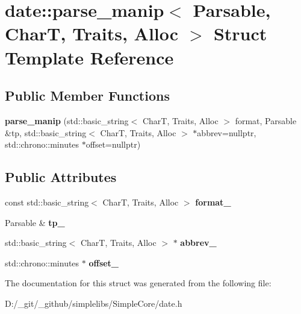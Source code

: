 \hypertarget{structdate_1_1parse__manip}{}\section{date\+::parse\+\_\+manip$<$ Parsable, CharT, Traits, Alloc $>$ Struct Template Reference}
\label{structdate_1_1parse__manip}
\subsection*{Public Member Functions}
\begin{DoxyCompactItemize}
\item 
\mbox{\label{structdate_1_1parse__manip_ae3b911fa07af62da7085e84fda0d2fdf}} 
{\bfseries parse\+\_\+manip} (std\+::basic\+\_\+string$<$ CharT, Traits, Alloc $>$ format, Parsable \&tp, std\+::basic\+\_\+string$<$ CharT, Traits, Alloc $>$ $\ast$abbrev=nullptr, std\+::chrono\+::minutes $\ast$offset=nullptr)
\end{DoxyCompactItemize}
\subsection*{Public Attributes}
\begin{DoxyCompactItemize}
\item 
\mbox{\label{structdate_1_1parse__manip_af27023b2d4f03f72000eab221ccc9479}} 
const std\+::basic\+\_\+string$<$ CharT, Traits, Alloc $>$ {\bfseries format\+\_\+}
\item 
\mbox{\label{structdate_1_1parse__manip_a156c770f48afd2baf9efc0ead9ad3f21}} 
Parsable \& {\bfseries tp\+\_\+}
\item 
\mbox{\label{structdate_1_1parse__manip_a2c8fe6bfdec4c1fb9e7c429f0279e84c}} 
std\+::basic\+\_\+string$<$ CharT, Traits, Alloc $>$ $\ast$ {\bfseries abbrev\+\_\+}
\item 
\mbox{\label{structdate_1_1parse__manip_a7b585e6309dd7baeacb7f67c90fea76e}} 
std\+::chrono\+::minutes $\ast$ {\bfseries offset\+\_\+}
\end{DoxyCompactItemize}


The documentation for this struct was generated from the following file\+:\begin{DoxyCompactItemize}
\item 
D\+:/\+\_\+git/\+\_\+github/simplelibs/\+Simple\+Core/date.\+h\end{DoxyCompactItemize}
